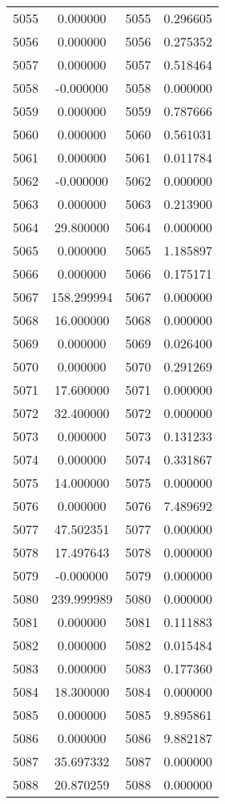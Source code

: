 \documentclass[12pt]{article}
\begin{document}
\begin{longtable}{@{}cccc@{}}
5055 & 0.000000 & 5055 & 0.296605 \\
5056 & 0.000000 & 5056 & 0.275352 \\
5057 & 0.000000 & 5057 & 0.518464 \\
5058 & -0.000000 & 5058 & 0.000000 \\
5059 & 0.000000 & 5059 & 0.787666 \\
5060 & 0.000000 & 5060 & 0.561031 \\
5061 & 0.000000 & 5061 & 0.011784 \\
5062 & -0.000000 & 5062 & 0.000000 \\
5063 & 0.000000 & 5063 & 0.213900 \\
5064 & 29.800000 & 5064 & 0.000000 \\
5065 & 0.000000 & 5065 & 1.185897 \\
5066 & 0.000000 & 5066 & 0.175171 \\
5067 & 158.299994 & 5067 & 0.000000 \\
5068 & 16.000000 & 5068 & 0.000000 \\
5069 & 0.000000 & 5069 & 0.026400 \\
5070 & 0.000000 & 5070 & 0.291269 \\
5071 & 17.600000 & 5071 & 0.000000 \\
5072 & 32.400000 & 5072 & 0.000000 \\
5073 & 0.000000 & 5073 & 0.131233 \\
5074 & 0.000000 & 5074 & 0.331867 \\
5075 & 14.000000 & 5075 & 0.000000 \\
5076 & 0.000000 & 5076 & 7.489692 \\
5077 & 47.502351 & 5077 & 0.000000 \\
5078 & 17.497643 & 5078 & 0.000000 \\
5079 & -0.000000 & 5079 & 0.000000 \\
5080 & 239.999989 & 5080 & 0.000000 \\
5081 & 0.000000 & 5081 & 0.111883 \\
5082 & 0.000000 & 5082 & 0.015484 \\
5083 & 0.000000 & 5083 & 0.177360 \\
5084 & 18.300000 & 5084 & 0.000000 \\
5085 & 0.000000 & 5085 & 9.895861 \\
5086 & 0.000000 & 5086 & 9.882187 \\
5087 & 35.697332 & 5087 & 0.000000 \\
5088 & 20.870259 & 5088 & 0.000000 \\

\end{longtable}
\end{document}
